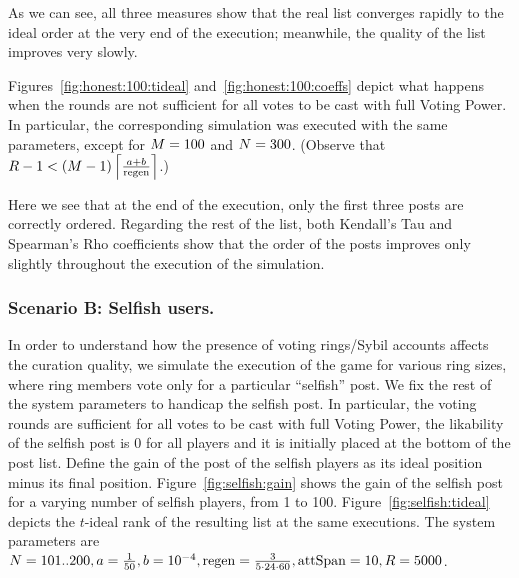       As we can see, all three measures show that the real list converges
      rapidly to the ideal order at the very end of the execution; meanwhile,
      the quality of the list improves very slowly.

      Figures~\ref{fig:honest:100:tideal} and~\ref{fig:honest:100:coeffs} depict
      what happens when the rounds are not sufficient for all votes to be cast
      with full Voting Power. In particular, the corresponding simulation was
      executed with the same parameters, except for $\postlen = 100$ and
      $\playerlen = 300$. (Observe that $\rounds - 1 < \left(\postlen -
      1\right)\ceil*{\frac{a + b}{\regen}}$.)

      Here we see that at the end of the execution, only the first three posts
      are correctly ordered. Regarding the rest of the list, both Kendall's Tau
      and Spearman's Rho coefficients show that the order of the posts improves
      only slightly throughout the execution of the simulation.

    \subsubsection{Scenario B: Selfish users.}
      In order to understand how the presence of voting rings/Sybil accounts
      affects the curation quality, we simulate the execution of the game for
      various ring sizes, where ring members vote only for a particular
      ``selfish'' post. We fix the rest of the system parameters to handicap the
      selfish post. In particular, the voting rounds are sufficient for all
      votes to be cast with full Voting Power, the likability of the selfish
      post is 0 for all players and it is initially placed at the bottom of the
      post list. Define the gain of the post of the selfish players as its ideal
      position minus its final position. Figure~\ref{fig:selfish:gain} shows the
      gain of the selfish post for a varying number of selfish players, from 1
      to 100.  Figure~\ref{fig:selfish:tideal} depicts the $t$-ideal rank of the
      resulting list at the same executions. The system parameters are
      $\playerlen = 101 .. 200, a = \frac{1}{50}, b = 10^{-4}, \regen =
      \frac{3}{5 \cdot 24 \cdot 60}, \attspan = 10, \rounds = 5000$.
